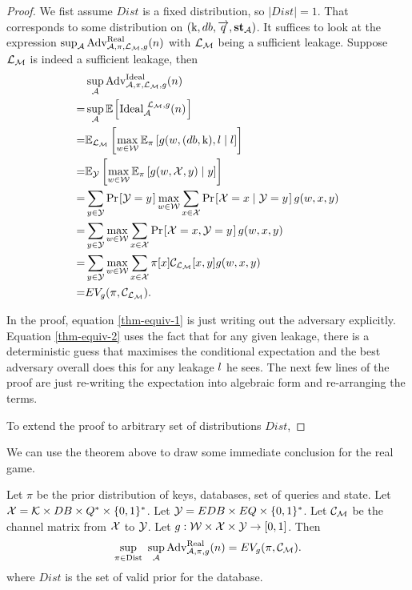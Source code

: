 \begin{proof} 
We fist assume $Dist$ is a fixed distribution, so $|Dist| = 1$. That corresponds to some distribution on $(\text{k}, db, \overrightarrow{q}, \textbf{st}_{\mathcal{A}})$. It suffices to look at the expression $\sup_{\mathcal{A}} \text{Adv}_{\mathcal{A}, \pi, \mathcal{L}_\mathcal{M}, g}^{\text{Real}}(n)$ with $\mathcal{L}_\mathcal{M}$ being a sufficient leakage. Suppose $\mathcal{L}_\mathcal{M}$ is indeed a sufficient leakage, then
\begin{align}
  & \sup_{\mathcal{A}} \advantage_{\mathcal{A}, \pi, \leakm, g}^{\text{Ideal}}(n) \\
= &	\sup_{\mathcal{A}} \expect{\text{Ideal}_{\adv}^{\ \leakm, g}(n)} \label{thm-equiv-1} \\
= & \mathbb{E}_{\leakm} \left[ \max_{w \in \W} \mathbb{E}_{\pi} \left[ g(w, (\db, \key), \leak \mid \leak \right] \right] \label{thm-equiv-2} \\
= &  \mathbb{E}_{\Y} \left[ \max_{w \in \W} \mathbb{E}_{\pi} \left[ g(w, \X, y) \mid y \right] \right] \\
= &  \sum_{y \in \Y} \prob{\Y = y} \max_{w \in \W} \sum_{x \in \X} \prob{\X = x \mid \Y = y} g(w, x, y) \\
= & \sum_{y \in \Y} \max_{w \in \W} \sum_{x \in \X} \prob{\X = x, \Y = y} g(w, x, y) \\
= & \sum_{y \in \Y} \max_{w \in \W} \sum_{x \in \X} \pi [x] \channelm[x, y] g(w, x, y) \\
= & EV_g(\pi, \channelm).
\end{align}

In the proof, equation \ref{thm-equiv-1} is just writing out the adversary explicitly. Equation \ref{thm-equiv-2} uses the fact that for any given leakage, there is a deterministic guess that maximises the conditional expectation and the best adversary overall does this for any leakage $l$ he sees. The next few lines of the proof are just re-writing the expectation into algebraic form and re-arranging the terms.

To extend the proof to arbitrary set of distributions $Dist$, 
\end{proof}


We can use the theorem above to draw some immediate conclusion for the real game.
\begin{proposition}
	Let $\pi$ be the prior distribution of keys, databases, set of queries and state. Let $\mathcal{X} = \mathcal{K} \times DB \times Q^{*} \times \{0,1\}^{*}$. Let $\mathcal{Y} = EDB \times EQ \times \{0,1\}^{*}$. Let $\mathcal{C}_{\mathcal{M}}$ be the channel matrix from $\mathcal{X}$ to $\mathcal{Y}$. Let $g: \mathcal{W} \times \mathcal{X} \times \mathcal{Y} \rightarrow [0,1]$. Then
	\begin{equation}
	\sup_{\pi \in \text{Dist}} \ \sup_{\mathcal{A}} \text{Adv}_{\mathcal{A}, \pi, g}^{\text{Real}}(n) = EV_g(\pi, \mathcal{C}_\mathcal{M}).
	\end{equation}
	where $Dist$ is the set of valid prior for the database.
\end{proposition}


